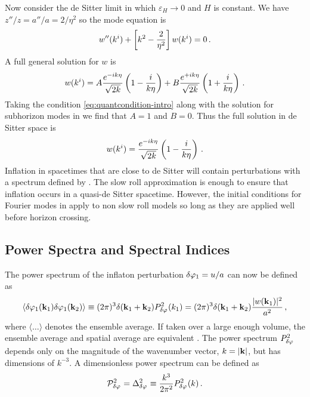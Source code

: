 Now consider the de Sitter limit in which $\varepsilon_H\rightarrow 0$ and $H$
is constant. We have $z''/z = a''/a = 2/\eta^2$ so the mode equation is
% 
\begin{equation}
  w''(k^i) + \left[ k^2 -\frac{2}{\eta^2} \right]w(k^i) = 0\,.
\end{equation}
% 
A full general solution for $w$ is
% 
\begin{equation}
 w(k^i) = A\frac{e^{-ik\eta}}{\sqrt{2k}}\left(1 -\frac{i}{k\eta}\right)
	  +B\frac{e^{+ik\eta}}{\sqrt{2k}}\left(1 +\frac{i}{k\eta}\right)\,.
\end{equation}
% 
Taking the condition \eqref{eq:quantcondition-intro} along with the solution
for subhorizon modes in  we find that $A=1$ and $B=0$.
Thus the full solution in de Sitter space is \cite{book:liddle}
% 
\begin{equation}
\label{eq:wfinal-intro}
 w(k^i) = \frac{e^{-ik\eta}}{\sqrt{2k}}\left(1 -\frac{i}{k\eta}\right)\,.
\end{equation}
% 
Inflation in spacetimes that are close to de Sitter will contain perturbations
with a spectrum defined by . The slow roll approximation is
enough to ensure that inflation occurs in a quasi-de Sitter spacetime.
However, the initial conditions for Fourier modes in 
apply to non slow roll models so long as they are applied well before horizon
crossing.


\subsection{Power Spectra and Spectral Indices}
The power spectrum of the inflaton perturbation $\delta\varphi_{1} = u/a$ can now be
defined as
% 
\begin{equation}
  \langle \delta\varphi_{1}(\textbf{k}_1) \delta\varphi_{1}(\textbf{k}_2) \rangle 
   \equiv (2\pi)^3 \delta(\textbf{k}_1 + \textbf{k}_2) P_{\delta\varphi_{}}^2 (k_1)
   = (2\pi)^3 \delta(\textbf{k}_1 + \textbf{k}_2) \frac{|w(\textbf{k}_1)|^2}{a^2}\,,
\end{equation}
% 
where $\langle \ldots \rangle$ denotes the ensemble average. 
If taken over a large enough volume, the ensemble average and spatial average
are equivalent \cite{book:lyth}.
The power spectrum
$P_{\delta\varphi_{}}^2$ depends only on the magnitude of the wavenumber
vector, $k=|\bf{k}|$, but has dimensions of $k^{-3}$. A dimensionless power
spectrum
can be defined as
% 
\begin{equation}
 \label{eq:curlPrdefn-intro}
 \mathcal{P}_{\delta\varphi_{}}^2= \Delta^2_{\delta\varphi_{}} \equiv \frac{k^3}{2\pi^2}
P_{\delta\varphi_{}}^2(k)\,.
\end{equation}
% 

